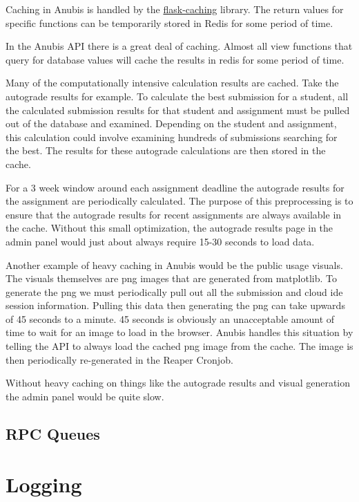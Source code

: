 Caching in Anubis is handled by the
\href{https://flask-caching.readthedocs.io/en/latest/index.html}{flask-caching} library.
The return values for specific functions can be temporarily stored in Redis for some
period of time.

In the Anubis API there is a great deal of caching.
Almost all view functions that query for database values will cache the results in redis
for some period of time.

Many of the computationally intensive calculation results are cached.
Take the autograde results for example.
To calculate the best submission for a student, all the
calculated submission results for that student and assignment must be pulled
out of the database and examined.
Depending on the student and assignment, this calculation could involve
examining hundreds of submissions searching for the best.
The results for these autograde calculations are then stored in the cache.

For a 3 week window around each assignment deadline the autograde results
for the assignment are periodically calculated.
The purpose of this preprocessing is to ensure that the autograde results
for recent assignments are always available in the cache.
Without this small optimization, the autograde results page in the admin
panel would just about always require 15-30 seconds to load data.

Another example of heavy caching in Anubis would be the public usage visuals.
The visuals themselves are png images that are generated from matplotlib.
To generate the png we must periodically pull out all the submission
and cloud ide session information.
Pulling this data then generating the png can take upwards of 45 seconds to a minute.
45 seconds is obviously an unacceptable amount of time to wait for an image to load
in the browser.
Anubis handles this situation by telling the API to always load the cached png image
from the cache.
The image is then periodically re-generated in the Reaper Cronjob.

Without heavy caching on things like the autograde results and visual generation
the admin panel would be quite slow.

\subsection{RPC Queues}\label{subsec:rpc-queues}

\section{Logging}\label{sec:logging}
